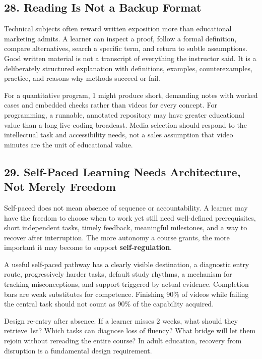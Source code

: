 \subsection*{28. Reading Is Not a Backup Format}

Technical subjects often reward written exposition more than educational marketing admits. A learner can inspect a proof, follow a formal definition, compare alternatives, search a specific term, and return to subtle assumptions. Good written material is not a transcript of everything the instructor said. It is a deliberately structured explanation with definitions, examples, counterexamples, practice, and reasons why methods succeed or fail.

For a quantitative program, 1 might produce short, demanding notes with worked cases and embedded checks rather than videos for every concept. For programming, a runnable, annotated repository may have greater educational value than a long live-coding broadcast. Media selection should respond to the intellectual task and accessibility needs, not a sales assumption that video minutes are the unit of educational value.

\subsection*{29. Self-Paced Learning Needs Architecture, Not Merely Freedom}

Self-paced does not mean absence of sequence or accountability. A learner may have the freedom to choose when to work yet still need well-defined prerequisites, short independent tasks, timely feedback, meaningful milestones, and a way to recover after interruption. The more autonomy a course grants, the more important it may become to support \textbf{self-regulation}.

A useful self-paced pathway has a clearly visible destination, a diagnostic entry route, progressively harder tasks, default study rhythms, a mechanism for tracking misconceptions, and support triggered by actual evidence. Completion bars are weak substitutes for competence. Finishing 90\% of videos while failing the central task should not count as 90\% of the capability acquired.

Design re-entry after absence. If a learner misses 2 weeks, what should they retrieve 1st? Which tasks can diagnose loss of fluency? What bridge will let them rejoin without rereading the entire course? In adult education, recovery from disruption is a fundamental design requirement.

